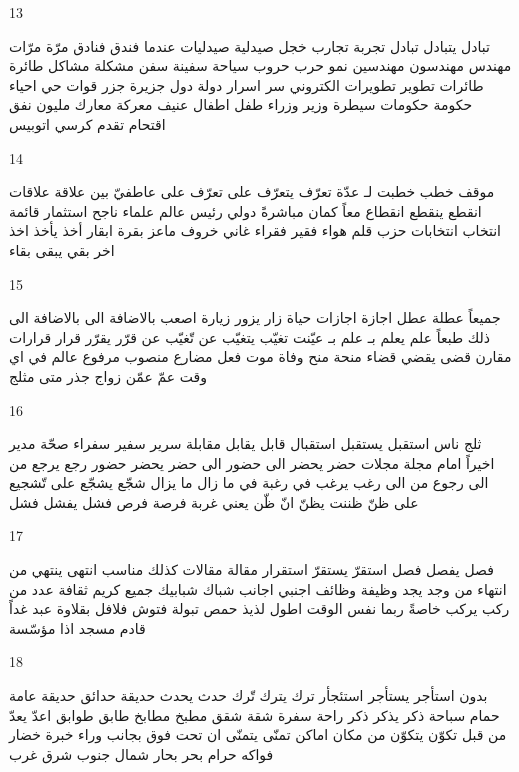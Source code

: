\documentclass[twocolumn,a4paper]{article}
\begin{document}
13

\textarabic{ تبادل  يتبادل   
 تبادل  
 تجربة  تجارب  
 خجل  
 صيدلية  صيدليات
 عندما  
 فندق  فنادق  
 مرّة  مرّات
 مهندس  مهندسون
  مهندسين
  نمو  
 حرب  حروب  
 سياحة  
 سفينة  سفن  
 مشكلة  مشاكل  
 طائرة  طائرات
 تطوير  تطويرات
 الكتروني  
  سر  اسرار  
 دولة  دول  
 جزيرة  جزر  
 قوات  
 حي  احياء  
 حكومة  حكومات
 سيطرة  
 وزير  وزراء  
 طفل  اطفال  
 عنيف  
 معركة  معارك  
 مليون  
 نفق  
 اقتحام  
 تقدم  
 كرسي  
 اتوبيس  
}

14

\textarabic{ موقف  
 خطب  خطبت لـ  
 عدّة  
 تعرّف  يتعرّف على   
 تعرّف على  
 عاطفيّ  
 بين  
 علاقة  علاقات
 انقطع  ينقطع   
 انقطاع  
 معاً  
 كمان  
 مباشرةً  
 دولي  
 رئيس  
 عالم  علماء  
 ناجح  
 استثمار  
 قائمة  
 انتخاب  انتخابات
 حزب  
 قلم  
 هواء  
 فقير  فقراء   
 غاني  
 خروف  
 ماعز  
 بقرة  ابقار  
 أخذ  يأخذ   
 اخذ  
 اخر  
 بقي  يبقى   
 بقاء  
}

15

\textarabic{ جميعاً  
 عطلة  عطل  
 اجازة  اجازات
 حياة  
 زار  يزور   
 زيارة  
 اصعب  
 باﻻضافة الى  
 باﻻضافة الى ذلك  
 طبعاً  
 علم  يعلم بـ   
 علم بـ  
 عيّنت  
 تغيّب  يتغيّب عن   
 تّغيّب عن  
 قرّر  يقرّر   
 قرار  قرارات
 مقارن  
 قضى  يقضي   
 قضاء  
 منحة  منح  
 وفاة  
 موت  
 فعل مضارع  
 منصوب  
 مرفوع  
 عالم  
 في اي وقت  
 عمّ  
 عمّن 
 زواج  
 جذر  
 متى  
 مثلج  
}

16

\textarabic{ ثلج  
 ناس  
 استقبل  يستقبل  استقبال   
 قابل  يقابل   
 مقابلة  
 سرير  
 سفير  سفراء  
 صحّة  
 مدير  
 اخيراً  
 امام  
 مجلة  مجلات
 حضر  يحضر الى  
 حضور الى  
 حضر  يحضر   
 حضور  
 رجع  يرجع من  الى   
 رجوع من  الى  
 رغب  يرغب في  
 رغبة في  
 ما زال  ما يزال  
 شجّع  يشجّع على  
 تّشجيع على  
 ظنّ  ظننت  يظنّ انّ   
 ظّن  
 يعني  
 غربة  
 فرصة  فرص  
 فشل  يفشل   
 فشل  
}

17

\textarabic{ فصل  يفصل   
 فصل  
 استقرّ  يستقرّ  استقرار   
 مقالة  مقالات
 كذلك  
 مناسب  
 انتهى  ينتهي من   
 انتهاء من  
 وجد  يجد   
 وظيفة  وظائف  
 اجنبي  اجانب  
 شباك  شبابيك  
 جميع  
 كريم  
 ثقافة  
 عدد من  
 ركب  يركب   
 خاصةً  
 ربما  
 نفس الوقت  
 اطول  
 لذيذ  
 حمص  
 تبولة  
 فتوش  
 فلافل  
 بقلاوة  
 عبد  
 غداً  
 قادم  
 مسجد  
 اذا  
 مؤسّسة  
}

18

\textarabic{ بدون  
 استأجر  يستأجر   استئجأر   
 ترك  يترك  
 تّرك  
 حدث  يحدث   
 حديقة  حدائق  
 حديقة عامة  
 حمام سباحة  
 ذكر  يذكر   
 ذكر  
 راحة  
 سفرة  
 شقة  شقق 
 مطبخ  مطابخ  
 طابق  طوابق  
 اعدّ  يعدّ   
 من قبل  
 تكوّن  يتكوّن من  
 مكان  اماكن  
 تمنّى  يتمنّى ان   
 تحت  
 فوق  
 بجانب  
 وراء  
 خبرة  
 خضار  
 فواكه  
 حرام  
 بحر  بحار  
 شمال  
 جنوب  
 شرق  
 غرب  
}
\end{document}
